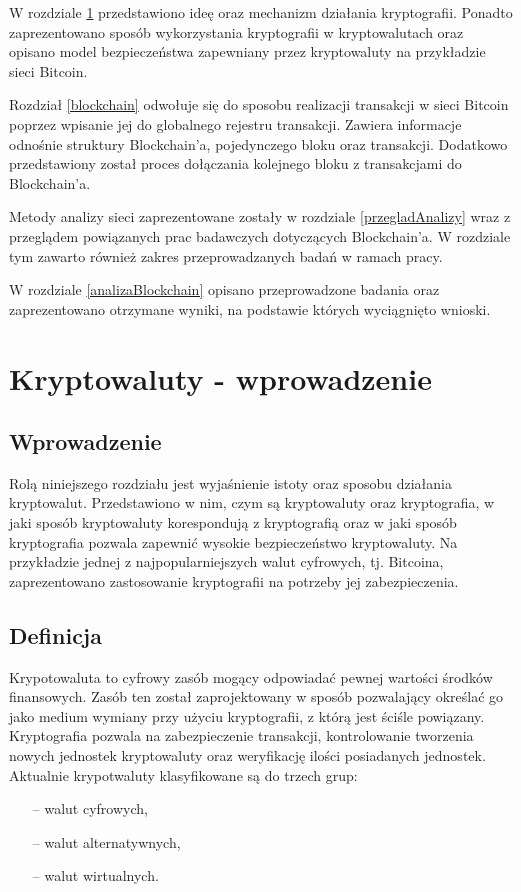 \documentclass[12pt, twoside, final, openany]{mgr}
\begin{document}
\indent W rozdziale \ref{kryptowaulty} przedstawiono ideę oraz mechanizm działania kryptografii. Ponadto zaprezentowano sposób wykorzystania kryptografii w kryptowalutach oraz opisano model bezpieczeństwa zapewniany przez kryptowaluty na przykładzie sieci Bitcoin.

\indent Rozdział \ref{blockchain} odwołuje się do sposobu realizacji transakcji w sieci Bitcoin poprzez wpisanie jej do globalnego rejestru transakcji. Zawiera informacje odnośnie struktury Blockchain'a, pojedynczego bloku oraz transakcji. Dodatkowo przedstawiony został proces dołączania kolejnego bloku z transakcjami do Blockchain'a.

\indent Metody analizy sieci zaprezentowane zostały w rozdziale \ref{przegladAnalizy} wraz z przeglądem powiązanych prac badawczych dotyczących Blockchain'a. W rozdziale tym zawarto również zakres przeprowadzanych badań w ramach pracy.

\indent W rozdziale \ref{analizaBlockchain} opisano przeprowadzone badania oraz zaprezentowano otrzymane wyniki, na podstawie których wyciągnięto wnioski.

\chapter{Kryptowaluty - wprowadzenie}
\label{kryptowaulty}
\section{Wprowadzenie} 
\label{sec:KryptowalutyWprowadzenie}
\indent Rolą niniejszego rozdziału jest wyjaśnienie istoty oraz sposobu działania kryptowalut. Przedstawiono w nim, czym są kryptowaluty oraz kryptografia, w jaki sposób kryptowaluty korespondują z kryptografią oraz w jaki sposób kryptografia pozwala zapewnić wysokie bezpieczeństwo kryptowaluty. Na przykładzie jednej z najpopularniejszych walut cyfrowych, tj. Bitcoina, zaprezentowano zastosowanie kryptografii na potrzeby jej zabezpieczenia.

\section{Definicja} \label{sec:definicjaKryptowaluty}
\indent Krypotowaluta to cyfrowy zasób mogący odpowiadać pewnej wartości środków finansowych. Zasób ten został zaprojektowany w sposób pozwalający określać go jako medium wymiany przy użyciu kryptografii, z którą jest ściśle powiązany. Kryptografia pozwala na zabezpieczenie transakcji, kontrolowanie tworzenia nowych jednostek kryptowaluty oraz weryfikację ilości posiadanych jednostek. Aktualnie krypotwaluty klasyfikowane są do trzech grup:
\begin{itemize}
\item[--] walut cyfrowych,
\item[--] walut alternatywnych,
\item[--] walut wirtualnych.
\end{itemize}
\end{document}
